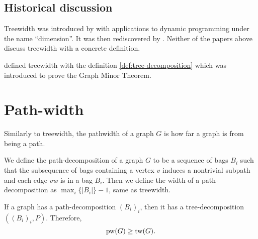 \subsection{Historical discussion}\label{ssec:tw_historical}
Treewidth was introduced by \textcite{berteleChapterEliminationVariables1972} with applications to dynamic programming under the name ``dimension''. It was then rediscovered by \textcite{halinSfunctionsGraphs1976}. Neither of the papers above discuss treewidth with a concrete definition.

\textcite{robertsonGraphMinorsIII1984} defined treewidth with the definition \cref{def:tree-decomposition} which was introduced to prove the Graph Minor Theorem\cite{robertsonGraphMinorsXX2004}.


\section{Path-width}\label{sec:Pathwidth}
Similarly to treewidth, the pathwidth of a graph \(G\) is how far a graph is from being a path.

We define the path-decomposition of a graph \(G\) to be a sequence of bags \(B_i\) such that the subsequence of bags containing a vertex \(v\) induces a nontrivial subpath and each edge \(vw\) is in a bag \(B_i\). Then we define the width of a path-decomposition as \(\max_i \lbrace |B_i| \rbrace -1\), same as treewidth.

If a graph has a path-decomposition \({(B_i)}_i\), then it has a tree-decomposition \(\left({(B_i)}_i, P\right)\). Therefore,
\begin{equation}
	\operatorname{pw}(G) \geq \operatorname{tw}(G).
\end{equation}

